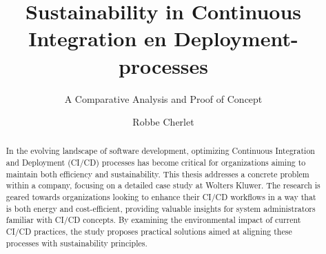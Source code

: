 \documentclass[a0,portrait]{hogent-poster}
\title{Sustainability in Continuous Integration en Deployment-processes}
\subtitle{A Comparative Analysis and Proof of Concept}
\author{Robbe Cherlet}
\begin{document}
\maketitle

\begin{abstract}
In the evolving landscape of software development, optimizing Continuous Integration and Deployment (CI/CD) processes has become critical for organizations aiming to maintain both efficiency and sustainability. This thesis addresses a concrete problem within a company, focusing on a detailed case study at Wolters Kluwer. The research is geared towards organizations looking to enhance their CI/CD workflows in a way that is both energy and cost-efficient, providing valuable insights for system administrators familiar with CI/CD concepts. By examining the environmental impact of current CI/CD practices, the study proposes practical solutions aimed at aligning these processes with sustainability principles.
  
\end{abstract}
\end{document}
